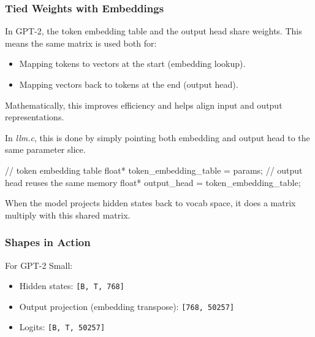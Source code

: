 \documentclass[
  letterpaper,
  DIV=11,
  numbers=noendperiod]{scrreprt}
\newenvironment{Shaded}{\begin{snugshade}}{\end{snugshade}}
\newcommand{\CommentTok}[1]{\textcolor[rgb]{0.37,0.37,0.37}{#1}}
\newcommand{\DataTypeTok}[1]{\textcolor[rgb]{0.68,0.00,0.00}{#1}}
\newcommand{\NormalTok}[1]{\textcolor[rgb]{0.00,0.23,0.31}{#1}}
\newcommand{\OperatorTok}[1]{\textcolor[rgb]{0.37,0.37,0.37}{#1}}
\providecommand{\tightlist}{%
  \setlength{\itemsep}{0pt}\setlength{\parskip}{0pt}}
\begin{document}
\subsubsection{Tied Weights with
Embeddings}\label{tied-weights-with-embeddings}

In GPT-2, the token embedding table and the output head share weights.
This means the same matrix is used both for:

\begin{itemize}
\tightlist
\item
  Mapping tokens to vectors at the start (embedding lookup).
\item
  Mapping vectors back to tokens at the end (output head).
\end{itemize}

Mathematically, this improves efficiency and helps align input and
output representations.

In \emph{llm.c}, this is done by simply pointing both embedding and
output head to the same parameter slice.

\begin{Shaded}
\begin{Highlighting}[]
\CommentTok{// token embedding table}
\DataTypeTok{float}\OperatorTok{*}\NormalTok{ token\_embedding\_table }\OperatorTok{=}\NormalTok{ params}\OperatorTok{;}
\CommentTok{// output head reuses the same memory}
\DataTypeTok{float}\OperatorTok{*}\NormalTok{ output\_head }\OperatorTok{=}\NormalTok{ token\_embedding\_table}\OperatorTok{;}
\end{Highlighting}
\end{Shaded}

When the model projects hidden states back to vocab space, it does a
matrix multiply with this shared matrix.

\subsubsection{Shapes in Action}\label{shapes-in-action}

For GPT-2 Small:

\begin{itemize}
\tightlist
\item
  Hidden states: \texttt{{[}B,\ T,\ 768{]}}
\item
  Output projection (embedding transpose): \texttt{{[}768,\ 50257{]}}
\item
  Logits: \texttt{{[}B,\ T,\ 50257{]}}
\end{itemize}
\end{document}
